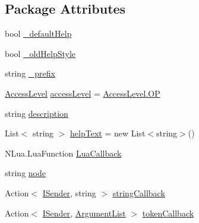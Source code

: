 \subsection*{Package Attributes}
\begin{DoxyCompactItemize}
\item 
bool \hyperlink{classOTA_1_1Command_1_1CommandInfo_ae5f2be77d70f9aa3e39592c03d5e93ad}{\+\_\+default\+Help}
\item 
bool \hyperlink{classOTA_1_1Command_1_1CommandInfo_a76779b40caa0fc6e1b5befa9eaaf29d2}{\+\_\+old\+Help\+Style}
\item 
string \hyperlink{classOTA_1_1Command_1_1CommandInfo_aaa38b4ee3afbaa5755461bec16579d32}{\+\_\+prefix}
\item 
\hyperlink{namespaceOTA_1_1Command_a0bb463ef02a9fd3406866a98c6fc2cdc}{Access\+Level} \hyperlink{classOTA_1_1Command_1_1CommandInfo_af68c80b3842e0ee78384be580308abe0}{access\+Level} = \hyperlink{namespaceOTA_1_1Command_a0bb463ef02a9fd3406866a98c6fc2cdca7457cdd15d09bfc6c4dbb5d2b6f87390}{Access\+Level.\+O\+P}
\item 
string \hyperlink{classOTA_1_1Command_1_1CommandInfo_a23af17c78302b71c14ef38ea40b8d1d7}{description}
\item 
List$<$ string $>$ \hyperlink{classOTA_1_1Command_1_1CommandInfo_ab02372b512a2298dd4e3326d363e787f}{help\+Text} = new List$<$string$>$()
\item 
N\+Lua.\+Lua\+Function \hyperlink{classOTA_1_1Command_1_1CommandInfo_a817f9ada52446111c0cdf4572b20dfbb}{Lua\+Callback}
\item 
string \hyperlink{classOTA_1_1Command_1_1CommandInfo_a90c46d7eb29ad8baa1281a134b56ab4c}{node}
\item 
Action$<$ \hyperlink{interfaceOTA_1_1Command_1_1ISender}{I\+Sender}, string $>$ \hyperlink{classOTA_1_1Command_1_1CommandInfo_a6d7bacc1b2cfbddf1148a21772022aca}{string\+Callback}
\item 
Action$<$ \hyperlink{interfaceOTA_1_1Command_1_1ISender}{I\+Sender}, \hyperlink{classOTA_1_1Command_1_1ArgumentList}{Argument\+List} $>$ \hyperlink{classOTA_1_1Command_1_1CommandInfo_a8924d7c0c150ba1bf80b6a4ddadc3b94}{token\+Callback}
\end{DoxyCompactItemize}
